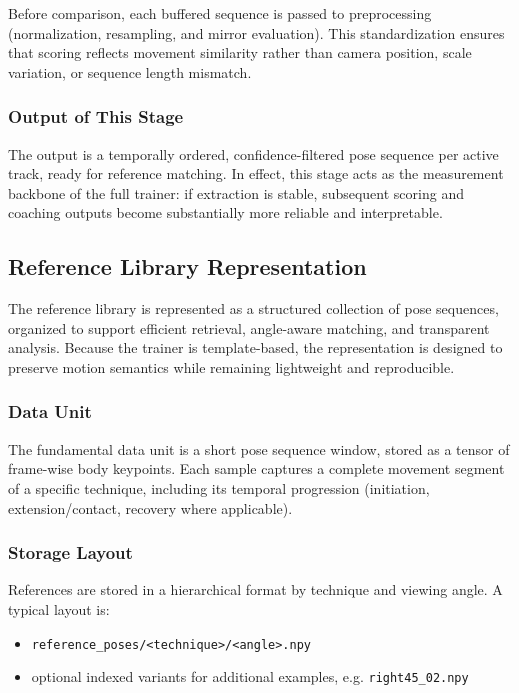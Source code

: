 \documentclass[12pt]{article}
\begin{document}
{Before comparison, each buffered sequence is passed to preprocessing (normalization, resampling, and mirror evaluation). This standardization ensures that scoring reflects movement similarity rather than camera position, scale variation, or sequence length mismatch.

\subsubsection{Output of This Stage}

The output is a temporally ordered, confidence-filtered pose sequence per active track, ready for reference matching. In effect, this stage acts as the measurement backbone of the full trainer: if extraction is stable, subsequent scoring and coaching outputs become substantially more reliable and interpretable.

\subsection{Reference Library Representation}

The reference library is represented as a structured collection of pose sequences, organized to support efficient retrieval, angle-aware matching, and transparent analysis. Because the trainer is template-based, the representation is designed to preserve motion semantics while remaining lightweight and reproducible.

\subsubsection{Data Unit}

The fundamental data unit is a short pose sequence window, stored as a tensor of frame-wise body keypoints. Each sample captures a complete movement segment of a specific technique, including its temporal progression (initiation, extension/contact, recovery where applicable).

\subsubsection{Storage Layout}

References are stored in a hierarchical format by technique and viewing angle. A typical layout is:

\begin{itemize}
    \item \texttt{reference\_poses/<technique>/<angle>.npy}
    \item optional indexed variants for additional examples, e.g. \texttt{right45\_02.npy}
\end{itemize}

}
\end{document}
